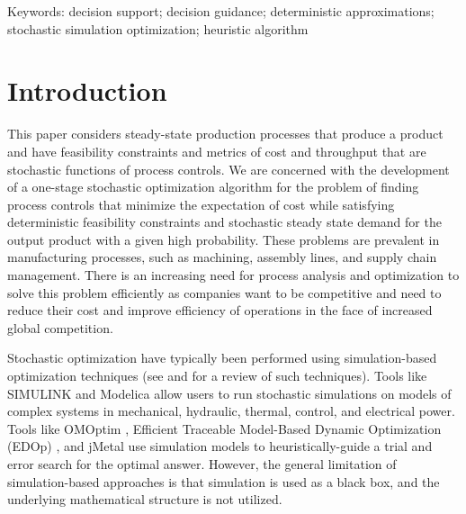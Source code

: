 \documentclass[a4paper, 12pt]{article} %
\begin{document}
{\small Keywords: decision support;
	decision guidance;
	deterministic approximations;
	stochastic simulation optimization;
	heuristic algorithm } %

\vspace{5pt} %

\section{Introduction}

This paper considers steady-state production processes that produce a product and have feasibility constraints and metrics of cost and throughput that are stochastic functions of process controls. 
We are concerned with the development of a one-stage stochastic optimization algorithm for the problem of finding process controls that minimize the expectation of cost while satisfying deterministic feasibility constraints and stochastic steady state demand for the output product with a given high probability.
These problems are prevalent in manufacturing processes, such as machining, assembly lines, and supply chain management.
There is an increasing need for process analysis and optimization to solve this problem efficiently as companies want to be competitive and need to reduce their cost and improve efficiency of operations in the face of increased global competition. 


Stochastic optimization have typically been performed using simulation-based optimization techniques (see \cite{Amaran2016} and \cite{Nguyen2014} for a review of such techniques). 
Tools like SIMULINK \cite{Dabney:2001:MS:557989} and Modelica \cite{elmqvist1998modelica,Provan2012modelica} allow users to run stochastic simulations on models of complex systems in mechanical, hydraulic, thermal, control, and electrical power.
Tools like OMOptim \cite{OMOptim}, Efficient Traceable Model-Based Dynamic Optimization (EDOp) \cite{EDOp}, and jMetal \cite{jMetal} use simulation models to heuristically-guide a trial and error search for the optimal answer. 
However, the general limitation of simulation-based approaches is that simulation is used as a black box, and the underlying mathematical structure is not utilized. 
\end{document}
